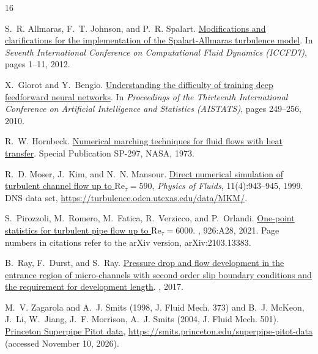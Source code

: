 \documentclass[11pt,a4paper]{article}
\begin{document}
\begin{thebibliography}{16}

S.~R. Allmaras, F.~T. Johnson, and P.~R. Spalart.
\newblock \href{https://iccfd.org/iccfd7/assets/pdf/papers/ICCFD7-1902_paper.pdf#page=2}{Modifications and clarifications for the implementation of the {Spalart-Allmaras} turbulence model}.
\newblock In {\em Seventh International Conference on Computational Fluid Dynamics (ICCFD7)}, pages 1--11, 2012. 

X.~Glorot and Y.~Bengio.
\newblock \href{https://proceedings.mlr.press/v9/glorot10a/glorot10a.pdf#page=4}{Understanding the difficulty of training deep feedforward neural networks}.
\newblock In {\em Proceedings of the Thirteenth International Conference on Artificial Intelligence and Statistics (AISTATS)}, pages 249--256, 2010. 

R.~W. Hornbeck.
\newblock \href{https://ntrs.nasa.gov/api/citations/19740004879/downloads/19740004879.pdf}{Numerical marching techniques for fluid flows with heat transfer}.
\newblock Special Publication SP-297, NASA, 1973. 

R.~D. Moser, J.~Kim, and N.~N. Mansour.
\newblock \href{https://turbulence.oden.utexas.edu/data/MKM/}{Direct numerical simulation of turbulent channel flow up to $\mathrm{Re}_\tau = 590$}, {\em Physics of Fluids}, 11(4):943--945, 1999.
\newblock DNS data set, \url{https://turbulence.oden.utexas.edu/data/MKM/}. 

S.~Pirozzoli, M.~Romero, M.~Fatica, R.~Verzicco, and P.~Orlandi.
\newblock \href{https://arxiv.org/pdf/2103.13383.pdf#page=7}{One-point statistics for turbulent pipe flow up to $\mathrm{Re}_\tau = 6000$}.
, 926:A28, 2021. Page numbers in citations refer to the arXiv version, arXiv:2103.13383. 

B.~Ray, F.~Durst, and S.~Ray.
\newblock \href{https://arxiv.org/pdf/1707.04947.pdf#page=8}{Pressure drop and flow development in the entrance region of micro-channels with second order slip boundary conditions and the requirement for development length}.
, 2017. 

M.~V. Zagarola and A.~J. Smits (1998, J. Fluid Mech. 373) and B.~J. McKeon, J.~Li, W.~Jiang, J.~F. Morrison, A.~J. Smits (2004, J. Fluid Mech. 501).
\newblock \href{https://smits.princeton.edu/superpipe-pitot-data}{Princeton Superpipe Pitot data}, \url{https://smits.princeton.edu/superpipe-pitot-data} (accessed November 10, 2026). 


\end{thebibliography}
\end{document}
